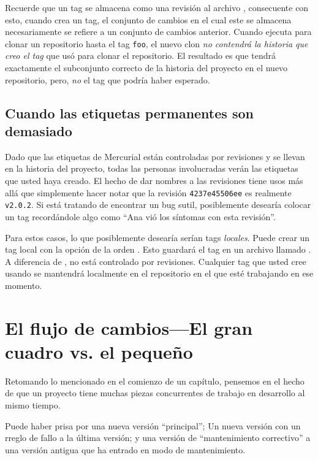 Recuerde que un tag se almacena como una revisión al archivo
, consecuente con esto, cuando crea un tag, el
conjunto de cambios en el cual este se almacena necesariamente se
refiere a un conjunto de cambios anterior. Cuando ejecuta
 para clonar un repositorio hasta el tag
\texttt{foo}, el nuevo clon \emph{no contendrá la historia que creo
el tag} que usó para clonar el repositorio. El resultado es que tendrá
exactamente el subconjunto correcto de la historia del proyecto en el
nuevo repositorio, pero, \emph{no} el tag que podría haber esperado.

\subsection{Cuando las etiquetas permanentes son demasiado}

Dado que las etiquetas de Mercurial están controladas por revisiones y se
llevan en la historia del proyecto, todas las personas involucradas
verán las etiquetas que usted haya creado. El hecho de dar nombres a las
revisiones tiene usos más allá que simplemente hacer notar que la
revisión \texttt{4237e45506ee} es realmente \texttt{v2.0.2}.  Si está
tratando de encontrar un bug sutil, posiblemente desearía colocar un
tag recordándole algo como ``Ana vió los síntomas con esta revisión''.

Para estos casos, lo que posiblemente desearía serían tags
\emph{locales}. Puede crear un tag local con la opción 
de la orden .  Esto guardará el tag en un archivo llamado
.  A diferencia de ,
 no está controlado por revisiones.
Cualquier tag que usted cree usando  se mantendrá
localmente en el repositorio en el que esté trabajando en ese momento.

\section{El flujo de cambios---El gran cuadro vs. el pequeño}

Retomando lo mencionado en el comienzo de un capítulo, pensemos en el
hecho de que un proyecto tiene muchas piezas concurrentes de trabajo
en desarrollo al mismo tiempo.

Puede haber prisa por una nueva versión ``principal''; Un nueva
versión con un rreglo de fallo a la última versión; y una versión de
``mantenimiento correctivo'' a una versión antigua que ha entrado en
modo de mantenimiento.

